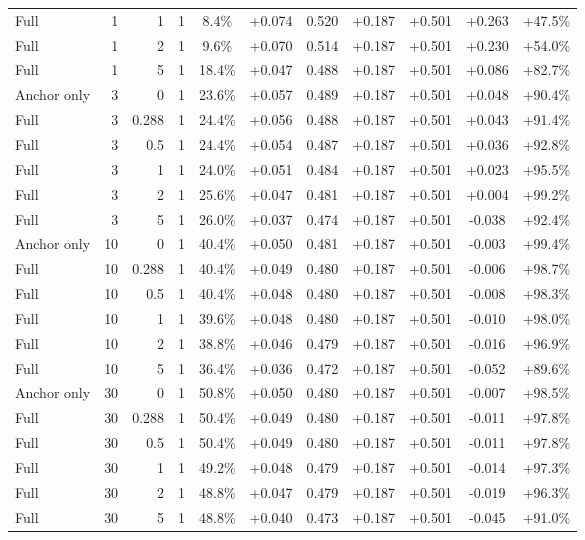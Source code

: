 \begin{table}[htbp]
\begin{tabular}{lrrrccccccc}
Full & 1 & 1 & 1 & 8.4\% & +0.074 & 0.520 & +0.187 & +0.501 & +0.263 & +47.5\% \\
Full & 1 & 2 & 1 & 9.6\% & +0.070 & 0.514 & +0.187 & +0.501 & +0.230 & +54.0\% \\
Full & 1 & 5 & 1 & 18.4\% & +0.047 & 0.488 & +0.187 & +0.501 & +0.086 & +82.7\% \\
Anchor only & 3 & 0 & 1 & 23.6\% & +0.057 & 0.489 & +0.187 & +0.501 & +0.048 & +90.4\% \\
Full & 3 & 0.288 & 1 & 24.4\% & +0.056 & 0.488 & +0.187 & +0.501 & +0.043 & +91.4\% \\
Full & 3 & 0.5 & 1 & 24.4\% & +0.054 & 0.487 & +0.187 & +0.501 & +0.036 & +92.8\% \\
Full & 3 & 1 & 1 & 24.0\% & +0.051 & 0.484 & +0.187 & +0.501 & +0.023 & +95.5\% \\
Full & 3 & 2 & 1 & 25.6\% & +0.047 & 0.481 & +0.187 & +0.501 & +0.004 & +99.2\% \\
Full & 3 & 5 & 1 & 26.0\% & +0.037 & 0.474 & +0.187 & +0.501 & -0.038 & +92.4\% \\
Anchor only & 10 & 0 & 1 & 40.4\% & +0.050 & 0.481 & +0.187 & +0.501 & -0.003 & +99.4\% \\
Full & 10 & 0.288 & 1 & 40.4\% & +0.049 & 0.480 & +0.187 & +0.501 & -0.006 & +98.7\% \\
Full & 10 & 0.5 & 1 & 40.4\% & +0.048 & 0.480 & +0.187 & +0.501 & -0.008 & +98.3\% \\
Full & 10 & 1 & 1 & 39.6\% & +0.048 & 0.480 & +0.187 & +0.501 & -0.010 & +98.0\% \\
Full & 10 & 2 & 1 & 38.8\% & +0.046 & 0.479 & +0.187 & +0.501 & -0.016 & +96.9\% \\
Full & 10 & 5 & 1 & 36.4\% & +0.036 & 0.472 & +0.187 & +0.501 & -0.052 & +89.6\% \\
Anchor only & 30 & 0 & 1 & 50.8\% & +0.050 & 0.480 & +0.187 & +0.501 & -0.007 & +98.5\% \\
Full & 30 & 0.288 & 1 & 50.4\% & +0.049 & 0.480 & +0.187 & +0.501 & -0.011 & +97.8\% \\
Full & 30 & 0.5 & 1 & 50.4\% & +0.049 & 0.480 & +0.187 & +0.501 & -0.011 & +97.8\% \\
Full & 30 & 1 & 1 & 49.2\% & +0.048 & 0.479 & +0.187 & +0.501 & -0.014 & +97.3\% \\
Full & 30 & 2 & 1 & 48.8\% & +0.047 & 0.479 & +0.187 & +0.501 & -0.019 & +96.3\% \\
Full & 30 & 5 & 1 & 48.8\% & +0.040 & 0.473 & +0.187 & +0.501 & -0.045 & +91.0\% \\

\end{tabular}
\end{table}
